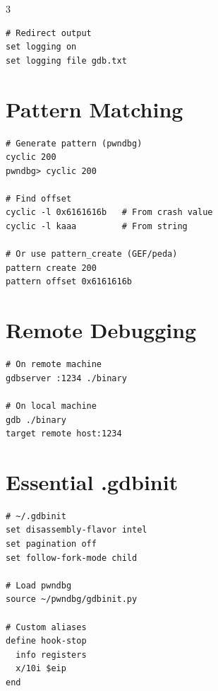 \documentclass[10pt,landscape,a4paper]{article}
\begin{document}
\begin{multicols}{3}
\begin{lstlisting}
# Redirect output
set logging on
set logging file gdb.txt
\end{lstlisting}

\section*{Pattern Matching}
\begin{lstlisting}
# Generate pattern (pwndbg)
cyclic 200
pwndbg> cyclic 200

# Find offset
cyclic -l 0x6161616b   # From crash value
cyclic -l kaaa         # From string

# Or use pattern_create (GEF/peda)
pattern create 200
pattern offset 0x6161616b
\end{lstlisting}

\section*{Remote Debugging}
\begin{lstlisting}
# On remote machine
gdbserver :1234 ./binary

# On local machine
gdb ./binary
target remote host:1234
\end{lstlisting}

\section*{Essential .gdbinit}
\begin{lstlisting}
# ~/.gdbinit
set disassembly-flavor intel
set pagination off
set follow-fork-mode child

# Load pwndbg
source ~/pwndbg/gdbinit.py

# Custom aliases
define hook-stop
  info registers
  x/10i $eip
end
\end{lstlisting}


\end{multicols}
\end{document}
